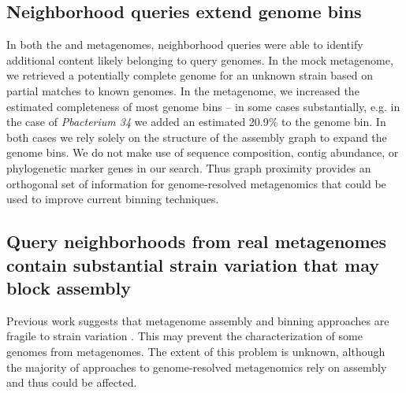 %
%
%

\subsection*{Neighborhood queries extend genome bins}

In both the \podarv and \hu metagenomes, neighborhood queries were
able to identify additional content likely belonging to query genomes.
In the \podarv mock metagenome, we retrieved a potentially complete
genome for an unknown strain based on partial matches to known
genomes. In the \hu metagenome, we increased the estimated
completeness of most genome bins -- in some cases substantially,
e.g. in the case of {\em P\textunderscore bacterium 34}
we added an estimated 20.9\% to the genome bin.  In both cases we rely
solely on the structure of the assembly graph to expand the genome
bins. We do not make use of sequence composition, contig abundance, or
phylogenetic marker genes in our search. Thus graph proximity provides
an orthogonal set of information for genome-resolved metagenomics that
could be used to improve current binning techniques.

\subsection*{Query neighborhoods from real metagenomes contain substantial strain variation that may block assembly}

Previous work suggests that metagenome assembly and binning
approaches are fragile to strain variation \cite{CAMI,Awad155358}. This may
prevent the characterization of some genomes from metagenomes.  The extent of this problem is unknown, although
the majority of approaches to genome-resolved metagenomics rely on
assembly and thus could be affected.

